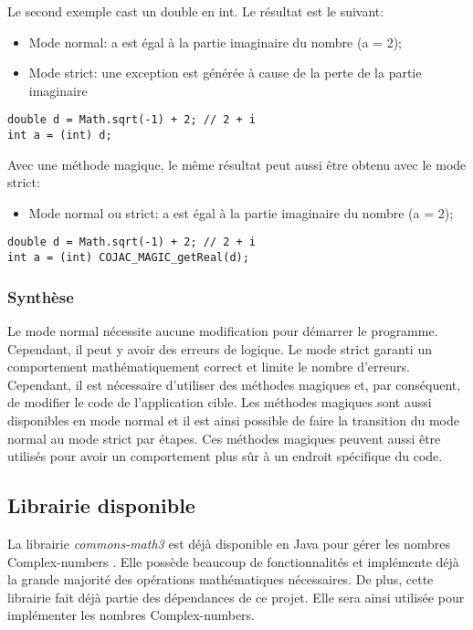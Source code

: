 Le second exemple cast un double en int. Le résultat est le suivant:

\begin{itemize}
    \item Mode normal: a est égal à la partie imaginaire du nombre (a = 2);
    \item Mode strict: une exception est générée à cause de la perte de la partie imaginaire
\end{itemize}

\begin{verbatim}
double d = Math.sqrt(-1) + 2; // 2 + i
int a = (int) d;
\end{verbatim}

Avec une méthode magique, le même résultat peut aussi être obtenu avec le mode strict:

\begin{itemize}
    \item Mode normal ou strict: a est égal à la partie imaginaire du nombre (a = 2);
\end{itemize}

\begin{verbatim}
double d = Math.sqrt(-1) + 2; // 2 + i
int a = (int) COJAC_MAGIC_getReal(d);
\end{verbatim}

\subsubsection{Synthèse}

Le mode normal nécessite aucune modification pour démarrer le programme. Cependant, il peut y avoir des erreurs de logique. Le mode strict garanti un comportement mathématiquement correct et limite le nombre d'erreurs. Cependant, il est nécessaire d'utiliser des méthodes magiques et, par conséquent, de modifier le code de l'application cible. Les méthodes magiques sont aussi disponibles en mode normal et il est ainsi possible de faire la transition du mode normal au mode strict par étapes. Ces méthodes magiques peuvent aussi être utilisés pour avoir un comportement plus sûr à un endroit spécifique du code.

\subsection{Librairie disponible}

La librairie \textit{commons-math3} est déjà disponible en Java pour gérer les nombres \glspl{Complex-number} \cite{apache-complex-documentation}. Elle possède beaucoup de fonctionnalités et implémente déjà la grande majorité des opérations mathématiques nécessaires. De plus, cette librairie fait déjà partie des dépendances de ce projet. Elle sera ainsi utilisée pour implémenter les nombres \glspl{Complex-number}.

